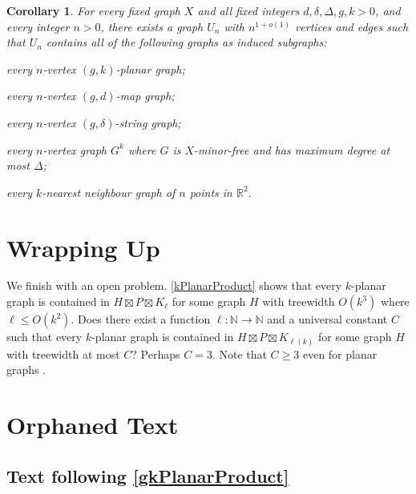 \documentclass{patmorin}
\theoremstyle{plain}
\newtheorem{cor}[thm]{Corollary}
\theoremstyle{definition}
\renewcommand{\geq}{\geqslant}
\renewcommand{\leq}{\leqslant}
\newcommand{\R}{\mathbb{R}}
\newcommand{\N}{\mathbb{N}}
\begin{document}
\begin{cor}\label{universal_cor}
	\label{UniversalUniversal}
	For every fixed graph $X$ and all fixed integers $d,\delta,\Delta,g,k>0$, and every integer $n>0$, there exists a graph $U_n$ with $n^{1+o(1)}$ vertices and edges such that $U_n$ contains all of the following graphs as induced subgraphs:
	\begin{compactitem}
		\item every $n$-vertex $(g,k)$-planar graph;
		\item every $n$-vertex $(g,d)$-map graph;
		\item every $n$-vertex $(g,\delta)$-string graph;
		\item every $n$-vertex graph $G^k$ where $G$ is $X$-minor-free and has maximum degree at most $\Delta$;
		\item every $k$-nearest neighbour graph of $n$ points in $\R^2$.
	\end{compactitem}
\end{cor}


\section{Wrapping Up}
\label{WrappingUp}


We finish with an open problem. \cref{kPlanarProduct} shows that every $k$-planar graph is contained in $H\boxtimes P \boxtimes K_\ell$ for some graph $H$ with treewidth $O(k^3)$ where $\ell\leq O(k^2)$. Does there exist a function $\ell:\N\to\N$ and a universal constant $C$ such that every $k$-planar graph is contained in $H\boxtimes P \boxtimes K_{\ell(k)}$ for some graph $H$ with treewidth at most $C$?  Perhaps $C=3$. Note that $C\geq 3$ even for planar graphs \citep{DJMMUW20}.






\section{Orphaned Text}

\subsection{Text following \cref{gkPlanarProduct}}
\end{document}
